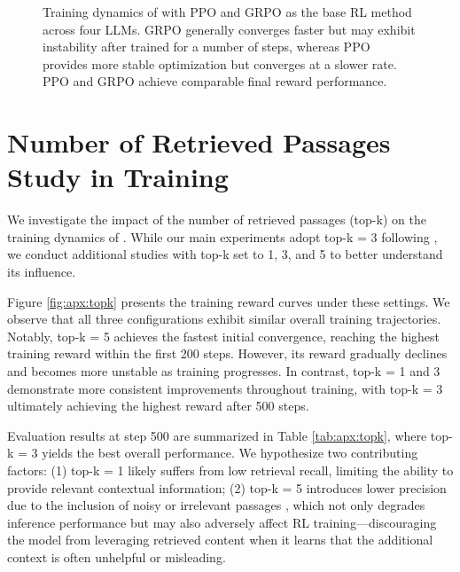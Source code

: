 \begin{figure}[h]
    \centering
    \hfill
    \hfill
    \hfill
    \caption{Training dynamics of \Ours with PPO and GRPO as the base RL method across four LLMs. GRPO generally converges faster but may exhibit instability after trained for a number of steps, whereas PPO provides more stable optimization but converges at a slower rate. PPO and GRPO achieve comparable final reward performance.}\label{fig:apx:ppo-grpo-study}
\end{figure}

\section{Number of Retrieved Passages Study in \Ours Training}\label{sec:apx:topk}

We investigate the impact of the number of retrieved passages (top-k) on the training dynamics of \Ours.
While our main experiments adopt top-k = 3 following \citet{lin2023ra}, we conduct additional studies with top-k set to 1, 3, and 5 to better understand its influence.

Figure \ref{fig:apx:topk} presents the training reward curves under these settings.
We observe that all three configurations exhibit similar overall training trajectories.
Notably, top-k = 5 achieves the fastest initial convergence, reaching the highest training reward within the first 200 steps. However, its reward gradually declines and becomes more unstable as training progresses.
In contrast, top-k = 1 and 3 demonstrate more consistent improvements throughout training, with top-k = 3 ultimately achieving the highest reward after 500 steps.

Evaluation results at step 500 are summarized in Table \ref{tab:apx:topk}, where top-k = 3 yields the best overall performance.
We hypothesize two contributing factors:
(1) top-k = 1 likely suffers from low retrieval recall, limiting the ability to provide relevant contextual information;
(2) top-k = 5 introduces lower precision due to the inclusion of noisy or irrelevant passages \citep{jin2024long}, which not only degrades inference performance but may also adversely affect RL training—discouraging the model from leveraging retrieved content when it learns that the additional context is often unhelpful or misleading.

